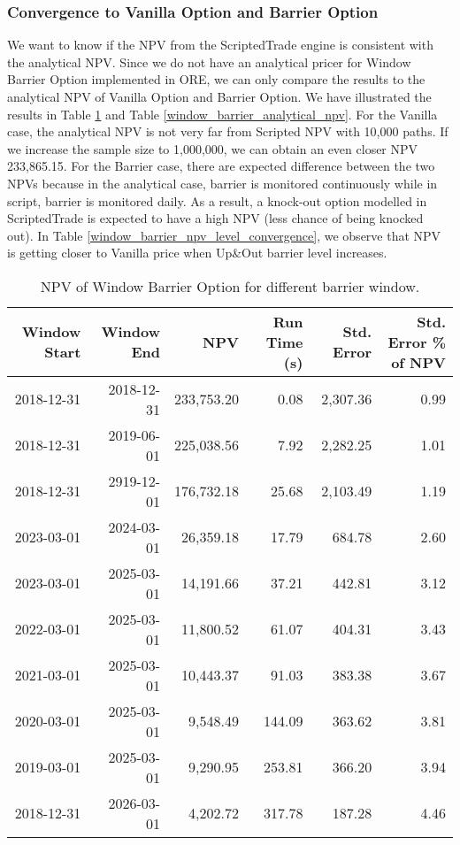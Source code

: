 \subsubsection{Convergence to Vanilla Option and Barrier Option}
We want to know if the NPV from the ScriptedTrade engine is consistent with the analytical NPV.
Since we do not have an analytical pricer for Window Barrier Option implemented in ORE, we can only compare
the results to the analytical NPV of Vanilla Option and Barrier Option. We have illustrated the results in
Table \ref{window_barrier_npv_window_convergence} and Table \ref{window_barrier_analytical_npv}. For the Vanilla case,
the analytical NPV is not very far from Scripted NPV with 10,000 paths. If we increase the sample size to
1,000,000, we can obtain an even closer NPV 233,865.15. For the Barrier case, there are expected difference
between the two NPVs because in the analytical case, barrier is monitored continuously while in script, barrier
is monitored daily. As a result, a knock-out option modelled in ScriptedTrade is expected to have a high NPV
(less chance of being knocked out). In Table \ref{window_barrier_npv_level_convergence}, we observe that
NPV is getting closer to Vanilla price when Up\&Out barrier level increases.

\begin{table}[!htbp]
  \centering
  \begin{tabular}{r | r | r | r | r | r}
    Window Start & Window End & NPV & Run Time (s) & Std. Error & Std. Error \% of NPV \\ \hline
    2018-12-31 & 2018-12-31 & 233,753.20 & 0.08 & 2,307.36 & 0.99 \\
    2018-12-31 & 2019-06-01 & 225,038.56 & 7.92 & 2,282.25 & 1.01 \\
    2018-12-31 & 2919-12-01 & 176,732.18 & 25.68 & 2,103.49 & 1.19 \\
    2023-03-01 & 2024-03-01 & 26,359.18 & 17.79 & 684.78 & 2.60 \\
    2023-03-01 & 2025-03-01 & 14,191.66 & 37.21 & 442.81 & 3.12 \\
    2022-03-01 & 2025-03-01 & 11,800.52 & 61.07 & 404.31 & 3.43 \\
    2021-03-01 & 2025-03-01 & 10,443.37 & 91.03 & 383.38 & 3.67 \\
    2020-03-01 & 2025-03-01 & 9,548.49 & 144.09 & 363.62 & 3.81 \\
    2019-03-01 & 2025-03-01 & 9,290.95 & 253.81 & 366.20 & 3.94 \\
    2018-12-31 & 2026-03-01 & 4,202.72 & 317.78 & 187.28 & 4.46 \\
  \end{tabular}
  \caption{NPV of Window Barrier Option for different barrier window.}
  \label{window_barrier_npv_window_convergence}
\end{table}

